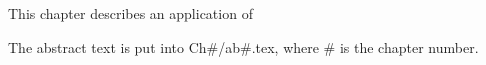 This chapter describes an application of 

The abstract text is put into Ch\#/ab\#.tex, where
\# is the chapter number.

